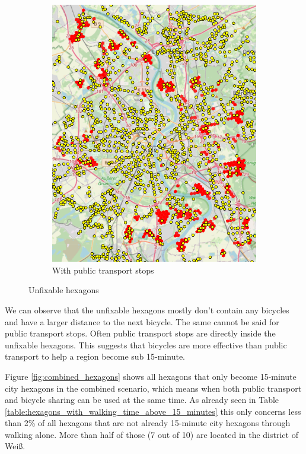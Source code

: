 \begin{figure}
\begin{subfigure}[b]{0.30\textwidth}
         \includegraphics[width=\textwidth]{Figures/results/problematic_hexagons/unfixable_with_stops.png}
         \caption{With public transport stops}
         \label{fig:unfixable_with_stops}
     \end{subfigure}
     \hfill
     \caption{Unfixable hexagons}
     \label{fig:unfixable_hexagons}
\end{figure}

We can observe that the unfixable hexagons mostly don't contain any bicycles and have a larger distance to the next bicycle.
The same cannot be said for public transport stops.
Often public transport stops are directly inside the unfixable hexagons.
This suggests that bicycles are more effective than public transport to help a region become sub 15-minute.



Figure \ref{fig:combined_hexagons} shows all hexagons that only become 15-minute city hexagons in the combined scenario, which means when both public transport and bicycle sharing can be used at the same time.
As already seen in Table \ref{table:hexagons_with_walking_time_above_15_minutes} this only concerns less than 2\% of all hexagons that are not already 15-minute city hexagons through walking alone.
More than half of those (7 out of 10) are located in the district of Weiß.


